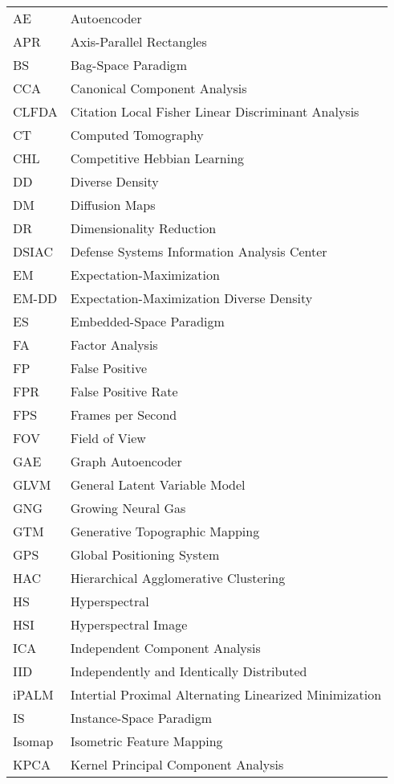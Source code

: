 \begin{longtable}{l p{5in}} %

AE & Autoencoder\\
APR & Axis-Parallel Rectangles\\
BS & Bag-Space Paradigm\\
CCA & Canonical Component Analysis\\
CLFDA &  Citation Local Fisher Linear Discriminant Analysis\\
CT & Computed Tomography\\
CHL & Competitive Hebbian Learning\\
DD & Diverse Density\\
DM & Diffusion Maps\\
DR & Dimensionality Reduction\\
DSIAC & Defense Systems Information Analysis Center\\
EM & Expectation-Maximization\\
EM-DD & Expectation-Maximization Diverse Density\\
ES & Embedded-Space Paradigm\\
FA & Factor Analysis\\
FP & False Positive\\ 
FPR & False Positive Rate\\
FPS & Frames per Second\\
FOV & Field of View\\
GAE & Graph Autoencoder\\
GLVM & General Latent Variable Model\\
GNG & Growing Neural Gas\\
GTM & Generative Topographic Mapping\\
GPS & Global Positioning System\\
HAC & Hierarchical Agglomerative Clustering\\
HS & Hyperspectral\\
HSI & Hyperspectral Image\\
ICA & Independent Component Analysis\\
IID & Independently and Identically Distributed\\
iPALM & Intertial Proximal Alternating Linearized Minimization\\
IS & Instance-Space Paradigm\\
Isomap & Isometric Feature Mapping\\
KPCA & Kernel Principal Component Analysis\\

\end{longtable}

